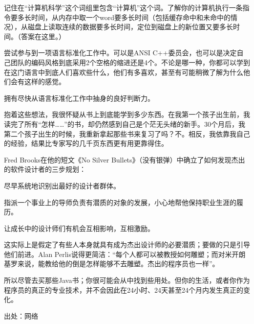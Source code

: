 \begin{compactitem}
\item 记住在“计算机科学”这个词组里包含“计算机”这个词。了解你的计算机执行一条指令要多长时间，从内存中取一个word要多长时间（包括缓存命中和未命中的情况），从磁盘上读取连续的数据要多长时间，定位到磁盘上的新位置又要多长时间。（答案在这里。）

\item 尝试参与到一项语言标准化工作中。可以是ANSI C++委员会，也可以是决定自己团队的编码风格到底采用2个空格的缩进还是4个。不论是哪一种，你都可以学到在这门语言中到底人们喜欢些什么，他们有多喜欢，甚至有可能稍微了解为什么他们会有这样的感觉。

\item 拥有尽快从语言标准化工作中抽身的良好判断力。

\end{compactitem}



抱着这些想法，我很怀疑从书上到底能学到多少东西。在我第一个孩子出生前，我读完了所有“怎样……”的书，却仍然感到自己是个茫无头绪的新手。30个月后，我第二个孩子出生的时候，我重新拿起那些书来复习了吗？不。相反，我依靠我自己的经验，结果比专家写的几千页东西更有用更靠得住。

Fred Brooks在他的短文《No Silver Bullets》（没有银弹）中确立了如何发现杰出的软件设计者的三步规划：

\begin{compactenum}
\item 尽早系统地识别出最好的设计者群体。
\item 指派一个事业上的导师负责有潜质的对象的发展，小心地帮他保持职业生涯的履历。
\item 让成长中的设计师们有机会互相影响，互相激励。
\end{compactenum}



这实际上是假定了有些人本身就具有成为杰出设计师的必要潜质；要做的只是引导他们前进。Alan Perlis说得更简洁：“每个人都可以被教授如何雕塑；而对米开朗基罗来说，能教给他的倒是怎样能够不去雕塑。杰出的程序员也一样”。

所以尽管去买那些Java书；你很可能会从中找到些用处。但你的生活，或者你作为程序员的真正的专业技术，并不会因此在24小时、24天甚至24个月内发生真正的变化。

出处：网络



\clearpage
